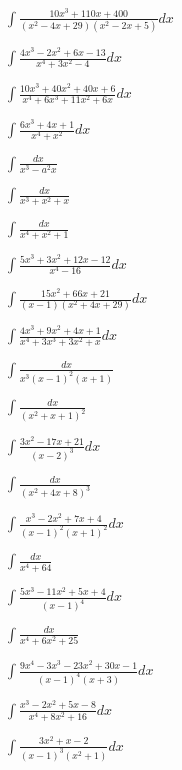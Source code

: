 \begin{multicols}{2}
$\displaystyle \int \frac{10x^3+110x+400}{(x^2-4x+29)(x^2-2x+5)}dx$

$\displaystyle \int \frac{4x^3-2x^2+6x-13}{x^4+3x^2-4}dx$

$\displaystyle \int \frac{10x^3+40x^2+40x+6}{x^4+6x^3+11x^2+6x}dx$

$\displaystyle \int \frac{6x^3+4x+1}{x^4+x^2}dx$

$\displaystyle \int \frac{dx}{x^3-a^2x}$

$\displaystyle \int \frac{dx}{x^3+x^2+x}$

$\displaystyle \int \frac{dx}{x^4+x^2+1}$

$\displaystyle \int \frac{5x^3+3x^2+12x-12}{x^4-16}dx$

$\displaystyle \int \frac{15x^2+66x+21}{(x-1)(x^2+4x+29)}dx$

$\displaystyle \int \frac{4x^3+9x^2+4x+1}{x^4+3x^3+3x^2+x}dx$

$\displaystyle \int \frac{dx}{x^3(x-1)^2(x+1)}$

$\displaystyle \int \frac{dx}{(x^2+x+1)^2}$

$\displaystyle \int \frac{3x^2-17x+21}{(x-2)^3}dx$

$\displaystyle \int \frac{dx}{(x^2+4x+8)^3}$

$\displaystyle \int \frac{x^3-2x^2+7x+4}{(x-1)^2(x+1)^2}dx$

$\displaystyle \int \frac{dx}{x^4+64}$

$\displaystyle \int \frac{5x^3-11x^2+5x+4}{(x-1)^4}dx$

$\displaystyle \int \frac{dx}{x^4+6x^2+25}$

$\displaystyle \int \frac{9x^4-3x^3-23x^2+30x-1}{(x-1)^4(x+3)}dx$

$\displaystyle \int \frac{x^3-2x^2+5x-8}{x^4+8x^2+16}dx$

$\displaystyle \int \frac{3x^2+x-2}{(x-1)^3(x^2+1)}dx$
\end{multicols}


